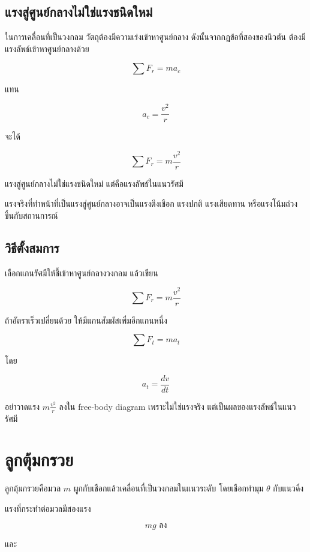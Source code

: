 \subsection{แรงสู่ศูนย์กลางไม่ใช่แรงชนิดใหม่}

ในการเคลื่อนที่เป็นวงกลม วัตถุต้องมีความเร่งเข้าหาศูนย์กลาง ดังนั้นจากกฎข้อที่สองของนิวตัน ต้องมีแรงลัพธ์เข้าหาศูนย์กลางด้วย

\[
\sum F_r=ma_c
\]

แทน

\[
a_c=\frac{v^2}{r}
\]

จะได้

\[
\sum F_r=m\frac{v^2}{r}
\]

\begin{tcolorbox}[title=แนวคิดสำคัญ]
แรงสู่ศูนย์กลางไม่ใช่แรงชนิดใหม่ แต่คือแรงลัพธ์ในแนวรัศมี

แรงจริงที่ทำหน้าที่เป็นแรงสู่ศูนย์กลางอาจเป็นแรงตึงเชือก แรงปกติ แรงเสียดทาน หรือแรงโน้มถ่วง ขึ้นกับสถานการณ์
\end{tcolorbox}

\subsection{วิธีตั้งสมการ}

เลือกแกนรัศมีให้ชี้เข้าหาศูนย์กลางวงกลม แล้วเขียน

\[
\sum F_r=m\frac{v^2}{r}
\]

ถ้าอัตราเร็วเปลี่ยนด้วย ให้มีแกนสัมผัสเพิ่มอีกแกนหนึ่ง

\[
\sum F_t=ma_t
\]

โดย

\[
a_t=\frac{dv}{dt}
\]

\begin{tcolorbox}[title=ข้อควรระวัง]
อย่าวาดแรง $m\frac{v^2}{r}$ ลงใน free-body diagram เพราะไม่ใช่แรงจริง แต่เป็นผลของแรงลัพธ์ในแนวรัศมี
\end{tcolorbox}

\section{ลูกตุ้มกรวย}

ลูกตุ้มกรวยคือมวล $m$ ผูกกับเชือกแล้วเคลื่อนที่เป็นวงกลมในแนวระดับ โดยเชือกทำมุม $\theta$ กับแนวดิ่ง

แรงที่กระทำต่อมวลมีสองแรง

\[
mg \text{ ลง}
\]

และ

